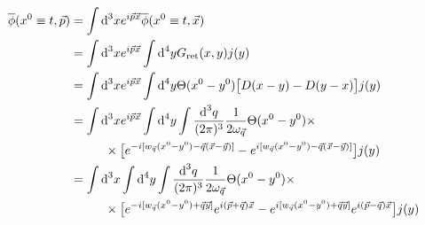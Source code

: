 \begin{subequations}
    \begin{align}
        \overline{\phi}(x^0\equiv t,\vec{p}) & =\int\dt^3x e^{\imagu\vec{p}\vec{x}}\overline{\phi}(x^0\equiv t,\vec{x})                                                                                                                                                                                                                                                           \\
                                             & =\int\dt^3xe^{\imagu\vec{p}\vec{x}}\int\dt^4yG_{\text{ret}}(x,y)j(y)                                                                                                                                                                                                                                                               \\
                                             & =\int\dt^3xe^{\imagu\vec{p}\vec{x}}\int\dt^4y\Theta(x^0-y^0)\big[D(x-y)-D(y-x)\big]j(y)                                                                                                                                                                                                                                            \\
                                             & =\int\dt^3xe^{\imagu\vec{p}\vec{x}}\int\dt^4y\int\frac{\dt^3q}{(2\pi)^3}\frac{1}{2\omega_{\vec{q}}}\Theta(x^0-y^0)\times\nonumber                                                                                                                                                                                                  \\
                                             & \phantom{=}\qquad\times\big[e^{-\imagu[w_{\vec{q}}(x^0-y^0)-\vec{q}(\vec{x}-\vec{y})]}-e^{\imagu[w_{\vec{q}}(x^0-y^0)-\vec{q}(\vec{x}-\vec{y})]}\big]j(y)                                                                                                                                                                          \\
                                             & =\int\dt^3x\int\dt^4y\int\frac{\dt^3q}{(2\pi)^3}\frac{1}{2\omega_{\vec{q}}}\Theta(x^0-y^0)\times\nonumber                                                                                                                                                                                                                          \\
                                             & \phantom{=}\qquad\times\big[e^{-\imagu[w_{\vec{q}}(x^0-y^0)+\vec{q}\vec{y}]}e^{\imagu(\vec{p}+\vec{q})\vec{x}}-e^{\imagu[w_{\vec{q}}(x^0-y^0)+\vec{q}\vec{y}]}e^{\imagu(\vec{p}-\vec{q})\vec{x}}\big]j(y)                                                                                                                          \\

\end{align}
\end{subequations}
